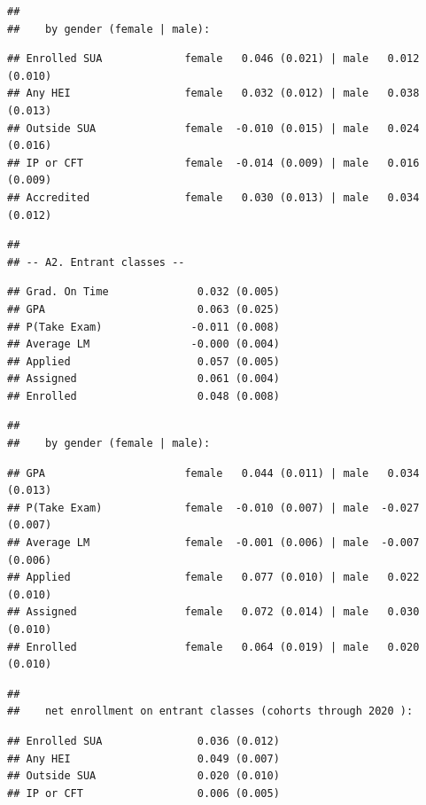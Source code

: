 \documentclass[
]{article}
\begin{document}
\begin{verbatim}
## 
##    by gender (female | male):
\end{verbatim}

\begin{verbatim}
## Enrolled SUA             female   0.046 (0.021) | male   0.012 (0.010)
## Any HEI                  female   0.032 (0.012) | male   0.038 (0.013)
## Outside SUA              female  -0.010 (0.015) | male   0.024 (0.016)
## IP or CFT                female  -0.014 (0.009) | male   0.016 (0.009)
## Accredited               female   0.030 (0.013) | male   0.034 (0.012)
\end{verbatim}

\begin{verbatim}
## 
## -- A2. Entrant classes --
\end{verbatim}

\begin{verbatim}
## Grad. On Time              0.032 (0.005)
## GPA                        0.063 (0.025)
## P(Take Exam)              -0.011 (0.008)
## Average LM                -0.000 (0.004)
## Applied                    0.057 (0.005)
## Assigned                   0.061 (0.004)
## Enrolled                   0.048 (0.008)
\end{verbatim}

\begin{verbatim}
## 
##    by gender (female | male):
\end{verbatim}

\begin{verbatim}
## GPA                      female   0.044 (0.011) | male   0.034 (0.013)
## P(Take Exam)             female  -0.010 (0.007) | male  -0.027 (0.007)
## Average LM               female  -0.001 (0.006) | male  -0.007 (0.006)
## Applied                  female   0.077 (0.010) | male   0.022 (0.010)
## Assigned                 female   0.072 (0.014) | male   0.030 (0.010)
## Enrolled                 female   0.064 (0.019) | male   0.020 (0.010)
\end{verbatim}

\begin{verbatim}
## 
##    net enrollment on entrant classes (cohorts through 2020 ):
\end{verbatim}

\begin{verbatim}
## Enrolled SUA               0.036 (0.012)
## Any HEI                    0.049 (0.007)
## Outside SUA                0.020 (0.010)
## IP or CFT                  0.006 (0.005)
\end{verbatim}
\end{document}
